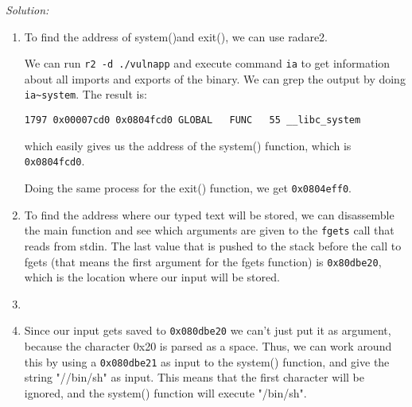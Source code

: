 \documentclass[a4paper,11pt]{article}
\newenvironment{solution}%
{\par{\noindent\small\textit{Solution:}}\vspace{-12pt}\begin{framed}}%
{\end{framed}\par}
\begin{document}
\ifsolution\begin{solution}
\begin{enumerate}
	\item To find the address of system()and exit(), we can use radare2.

		We can run \texttt{r2 -d ./vulnapp} and execute command \texttt{ia} to get information about all imports
		and exports of the binary. We can grep the output by doing \texttt{ia\textasciitilde{}system}. 
		The result is: 
		
		\verb|1797 0x00007cd0 0x0804fcd0 GLOBAL   FUNC   55 __libc_system|

		which easily gives us the address of the system() function, which is \texttt{0x0804fcd0}.

		Doing the same process for the exit() function, we get \texttt{0x0804eff0}.



  \item To find the address where our typed text will be stored, we can disassemble the main function and see which
	  arguments are given to the \texttt{fgets} call that reads from stdin. 
		The last value that is pushed to the stack before the call to fgets (that means the first argument for the fgets function) is \texttt{0x80dbe20}, which is the location 
		where our input will be stored.
  \item 

	  \begin{drawstack}
		  \startframe

			\startframe
		  \startframe

	\startframe
		  \startframe
		    

		  \startframe
		    



	  \end{drawstack}
  \item Since our input gets saved to \texttt{0x080dbe20} we can't just put it as argument, because the character 0x20 is parsed as a space.
	  Thus, we can work around this by using a \texttt{0x080dbe21} as input to the system() function, and give the string "//bin/sh" as input.
		This means that the first character will be ignored, and the system() function will execute "/bin/sh".


\end{enumerate}
\end{solution}
\end{document}
